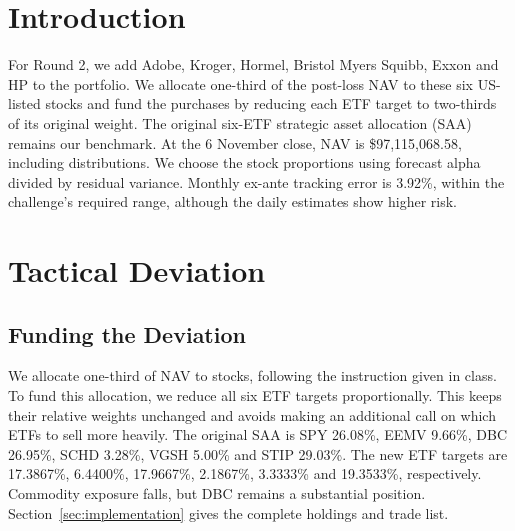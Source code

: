 \documentclass[10pt,a4paper]{article}
\begin{document}
\section*{Introduction}
For Round 2, we add Adobe, Kroger, Hormel, Bristol Myers Squibb, Exxon and HP to the portfolio. We allocate one-third of the post-loss NAV to these six US-listed stocks and fund the purchases by reducing each ETF target to two-thirds of its original weight. The original six-ETF strategic asset allocation (SAA) remains our benchmark. At the 6 November close, NAV is \$97,115,068.58, including distributions. We choose the stock proportions using forecast alpha divided by residual variance. Monthly ex-ante tracking error is 3.92\%, within the challenge's required range, although the daily estimates show higher risk.

\section{Tactical Deviation}
\label{sec:deviation}

\subsection{Funding the Deviation}
We allocate one-third of NAV to stocks, following the instruction given in class. To fund this allocation, we reduce all six ETF targets proportionally. This keeps their relative weights unchanged and avoids making an additional call on which ETFs to sell more heavily. The original SAA is SPY 26.08\%, EEMV 9.66\%, DBC 26.95\%, SCHD 3.28\%, VGSH 5.00\% and STIP 29.03\%. The new ETF targets are 17.3867\%, 6.4400\%, 17.9667\%, 2.1867\%, 3.3333\% and 19.3533\%, respectively. Commodity exposure falls, but DBC remains a substantial position. Section~\ref{sec:implementation} gives the complete holdings and trade list.


\begin{center}
\end{center}
\end{document}
